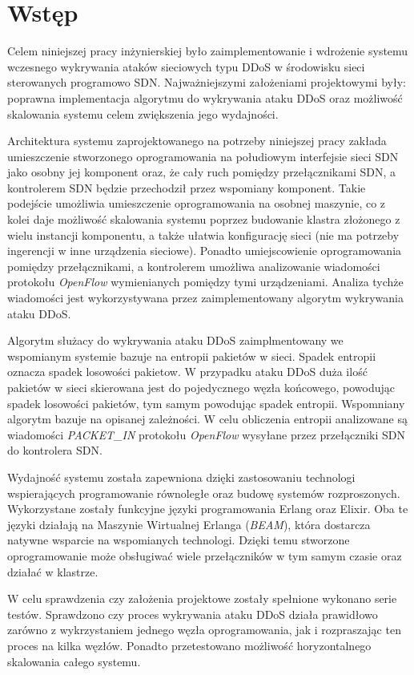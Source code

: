 \chapter{Wstęp}

Celem niniejszej pracy inżynierskiej było zaimplementowanie i wdrożenie systemu
wczesnego wykrywania ataków sieciowych typu DDoS w środowisku sieci sterowanych
programowo SDN. Najważniejszymi założeniami projektowymi były: poprawna
implementacja algorytmu do wykrywania ataku DDoS oraz możliwość skalowania
systemu celem zwiększenia jego wydajności.

Architektura systemu zaprojektowanego na potrzeby niniejszej pracy zakłada
umieszczenie stworzonego oprogramowania na połudiowym interfejsie sieci SDN jako
osobny jej komponent oraz, że cały ruch pomiędzy przełącznikami SDN, a
kontrolerem SDN będzie przechodził przez wspomiany komponent. Takie podejście
umożliwia umieszczenie oprogramowania na osobnej maszynie, co z kolei daje
możliwość skalowania systemu poprzez budowanie klastra złożonego z wielu
instancji komponentu, a także ułatwia konfigurację sieci (nie ma potrzeby
ingerencji w inne urządzenia sieciowe). Ponadto umiejscowienie oprogramowania
pomiędzy przełącznikami, a kontrolerem umożliwa analizowanie wiadomości
protokołu \textit{OpenFlow} wymienianych pomiędzy tymi urządzeniami. Analiza
tychże wiadomości jest wykorzystywana przez zaimplementowany algorytm wykrywania
ataku DDoS.

Algorytm służacy do wykrywania ataku DDoS zaimplmentowany we wspomianym systemie
bazuje na entropii pakietów w sieci. Spadek entropii oznacza spadek losowości
pakietow. W przypadku ataku DDoS duża ilość pakietów w sieci skierowana
jest do pojedycznego węzła końcowego, powodując spadek losowości pakietów, tym
samym powodując spadek entropii. Wspomniany algorytm bazuje na opisanej
zależności. W celu obliczenia entropii analizowane są wiadomości
\textit{PACKET\_IN} protokołu \textit{OpenFlow} wysyłane przez przełączniki SDN
do kontrolera SDN.

Wydajność systemu została zapewniona dzięki zastosowaniu technologi
wspierających programowanie równoległe oraz budowę systemów rozproszonych.
Wykorzystane zostały funkcyjne języki programowania Erlang oraz Elixir. Oba te
języki działają na Maszynie Wirtualnej Erlanga (\textit{BEAM}), która dostarcza
natywne wsparcie na wspomianych technologi. Dzięki temu stworzone oprogramowanie
może obsługiwać wiele przełączników w tym samym czasie oraz działać w klastrze.

W celu sprawdzenia czy założenia projektowe zostały spełnione wykonano serie
testów. Sprawdzono czy proces wykrywania ataku DDoS działa prawidłowo zarówno z
wykrzystaniem jednego węzła oprogramowania, jak i rozpraszając ten proces na
kilka węzłów. Ponadto przetestowano możliwość horyzontalnego skalowania całego
systemu.